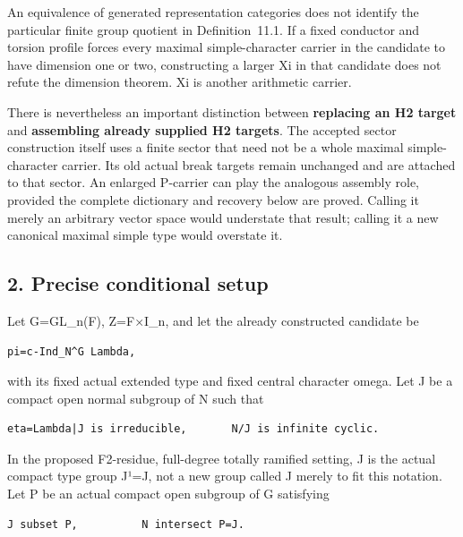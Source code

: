 An equivalence of generated representation categories does not identify
the particular finite group quotient in Definition~11.1. If a fixed
conductor and torsion profile forces every maximal simple-character
carrier in the candidate to have dimension one or two, constructing a
larger Xi in that candidate does not refute the dimension theorem. Xi is
another arithmetic carrier.

There is nevertheless an important distinction between \textbf{replacing
an H2 target} and \textbf{assembling already supplied H2 targets}. The
accepted sector construction itself uses a finite sector that need not
be a whole maximal simple-character carrier. Its old actual break
targets remain unchanged and are attached to that sector. An enlarged
P-carrier can play the analogous assembly role, provided the complete
dictionary and recovery below are proved. Calling it merely an arbitrary
vector space would understate that result; calling it a new canonical
maximal simple type would overstate it.

\hypertarget{lowrank_contract-precise-conditional-setup}{%
\subsection{2. Precise conditional
setup}\label{lowrank_contract-precise-conditional-setup}}

Let G=GL\_n(F), Z=F×I\_n, and let the already constructed candidate be

\begin{Verbatim}[fontsize=\small,breaklines=true,breakanywhere=true]
pi=c-Ind_N^G Lambda,
\end{Verbatim}

with its fixed actual extended type and fixed central character omega.
Let J be a compact open normal subgroup of N such that

\begin{Verbatim}[fontsize=\small,breaklines=true,breakanywhere=true]
eta=Lambda|J is irreducible,       N/J is infinite cyclic.
\end{Verbatim}

In the proposed F2-residue, full-degree totally ramified setting, J is
the actual compact type group J¹=J, not a new group called J merely to
fit this notation. Let P be an actual compact open subgroup of G
satisfying

\begin{Verbatim}[fontsize=\small,breaklines=true,breakanywhere=true]
J subset P,          N intersect P=J.
\end{Verbatim}

